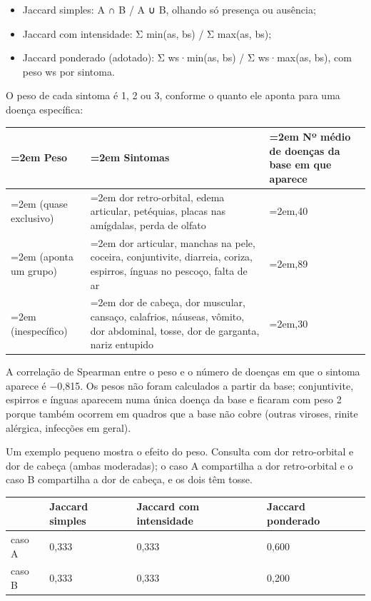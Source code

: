 \documentclass[12pt, a4paper]{article}
\providecommand{\tightlist}{%
  \setlength{\itemsep}{0pt}\setlength{\parskip}{0pt}}
\begin{document}
\begin{itemize}
\tightlist
\item
  Jaccard simples: \textbar A ∩ B\textbar{} / \textbar A ∪ B\textbar, olhando só presença ou ausência;
\item
  Jaccard com intensidade: Σ min(as, bs) / Σ max(as, bs);
\item
  Jaccard ponderado (adotado): Σ ws·min(as, bs) / Σ ws·max(as, bs), com peso ws por sintoma.
\end{itemize}

O peso de cada sintoma é 1, 2 ou 3, conforme o quanto ele aponta para uma doença específica:

\begingroup
\setlength{\tabcolsep}{4.0pt}
\begin{longtable}{@{}>{\raggedright\hyphenpenalty=30\tolerance=999\emergencystretch=2em\arraybackslash}p{3.21cm}>{\raggedright\hyphenpenalty=30\tolerance=999\emergencystretch=2em\arraybackslash}p{8.09cm}>{\raggedright\hyphenpenalty=30\tolerance=999\emergencystretch=2em\arraybackslash}p{3.42cm}@{}}
\toprule\noalign{}
Peso & Sintomas & Nº médio de doenças da base em que aparece \\
\midrule\noalign{}
\endhead
\bottomrule\noalign{}
\endlastfoot
3 (quase exclusivo\allowbreak ) & dor retro-orbital, edema articular, petéquias, placas nas amígdalas, perda de olfato & 1,40 \\
2 (aponta um grupo\allowbreak ) & dor articular, manchas na pele, coceira, conjuntivite, diarreia, coriza, espirros, ínguas no pescoço, falta de ar & 1,89 \\
1 (ines\-pe\-cí\-fico\allowbreak ) & dor de cabeça, dor muscular, cansaço, calafrios, náuseas, vômito, dor abdominal, tosse, dor de garganta, nariz entupido & 4,30 \\
\end{longtable}
\endgroup

A correlação de Spearman entre o peso e o número de doenças em que o sintoma aparece é −0,815. Os pesos não foram calculados a partir da base; conjuntivite, espirros e ínguas aparecem numa única doença da base e ficaram com peso 2 porque também ocorrem em quadros que a base não cobre (outras viroses, rinite alérgica, infecções em geral).

Um exemplo pequeno mostra o efeito do peso. Consulta com dor retro-orbital e dor de cabeça (ambas moderadas); o caso A compartilha a dor retro-orbital e o caso B compartilha a dor de cabeça, e os dois têm tosse.

\begin{longtable}{@{}llll@{}}
\toprule\noalign{}
& Jaccard simples & Jaccard com intensidade & Jaccard ponderado \\
\midrule\noalign{}
\endhead
\bottomrule\noalign{}
\endlastfoot
caso A & 0,333 & 0,333 & 0,600 \\
caso B & 0,333 & 0,333 & 0,200 \\
\end{longtable}
\end{document}
